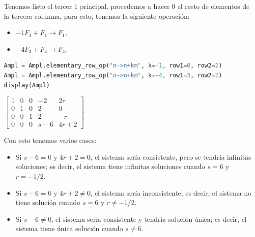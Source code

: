 \documentclass[12pt,a4]{aleph-examen}
\begin{document}
\begin{preguntas}
\begin{respuesta}
Tenemos listo el tercer \(1\) principal, procedemos a hacer \(0\) el
resto de elementos de la tercera columna, para esto, tenemos la
siguiente operación: 
\begin{itemize}
    \item \(-1F_3+F_1\to F_1\),
    \item \(-4F_3+F_4\to F_4\).
\end{itemize}
\begin{pycodigo}
    \begin{ipynbcodigo}\begin{lstlisting}[language=Python]
Ampl = Ampl.elementary_row_op("n->n+km", k=-1, row1=0, row2=2)
Ampl = Ampl.elementary_row_op("n->n+km", k=-4, row1=3, row2=2)
display(Ampl)
    \end{lstlisting}\end{ipynbcodigo}
    \begin{ipynbsalida}[2mm]
    $\displaystyle \left[\begin{matrix}1 & 0 & 0 & -2 & 2 r\\0 & 1 & 0 & 2 & 0\\0 & 0 & 1 & 2 & - r\\0 & 0 & 0 & s - 6 & 4 r + 2\end{matrix}\right]$
    \end{ipynbsalida}
\end{pycodigo}

Con esto tenemos varios casos:

\begin{itemize}
\item
  Si \(s-6=0\) y \(4r+2=0\), el sistema sería consistente, pero se
  tendría infinitas soluciones; es decir, el sistema tiene infinitas
  soluciones cuando \(s=6\) y \(r=-1/2\).
\item
  Si \(s-6=0\) y \(4r+2\neq 0\), el sistema sería inconsistente; es
  decir, el sistema no tiene solución cuando \(s=6\) y \(r\neq -1/2\).
\item
  Si \(s-6\neq 0\), el sistema sería consistente y tendría solución
  única; es decir, el sistema tiene única solución cuando \(s\neq 6\).\qedhere
\end{itemize}

\end{respuesta}



\end{preguntas}
\end{document}
